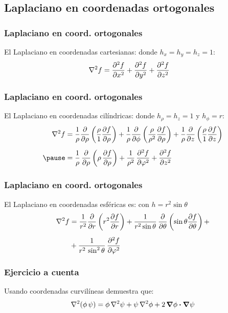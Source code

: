 \documentclass[12pt]{beamer}
\begin{document}
\subsection{Laplaciano en coordenadas ortogonales}

\begin{frame}
\frametitle{Laplaciano en coord. ortogonales}
El Laplaciano en coordenadas cartesianas:
\pause
donde $h_{x} = h_{y} = h_{z} = 1$:
\begin{align*}
\laplacian{f} &= \pdv[2]{f}{x} + \pdv[2]{f}{y} + \pdv[2]{f}{z}
\end{align*}
\end{frame}
\begin{frame}
\frametitle{Laplaciano en coord. ortogonales}
El Laplaciano en coordenadas cilíndricas:
\pause
donde $h_{\rho} = h_{z} = 1$ y $h_{\phi} = r$:
\begin{eqnarray*}
\begin{aligned}
\laplacian{f} &= \dfrac{1}{\rho} \pdv{\rho} \left( \dfrac{\rho}{1} \pdv{f}{\rho} \right) + \dfrac{1}{\rho} \pdv{\phi} \left( \dfrac{\rho}{\rho^{2}} \pdv{f}{\rho} \right) + \dfrac{1}{\rho} \pdv{z} \left( \dfrac{\rho}{1} \pdv{f}{z} \right) \\[0.5em] \pause
&= \dfrac{1}{\rho} \, \pdv{\rho} \left( \rho \, \pdv{f}{\rho} \right) + \dfrac{1}{\rho^{2}} \, \pdv[2]{f}{\varphi} + \pdv[2]{f}{z} 
\end{aligned}
\end{eqnarray*}
\end{frame}
\begin{frame}
\frametitle{Laplaciano en coord. ortogonales}
El Laplaciano en coordenadas esféricas es:
\pause
con $h = r^{2} \sin \theta$
\begin{align*}    
\laplacian{f} &= \dfrac{1}{r^{2}} \pdv{r} \left( r^{2} \pdv{f}{r} \right) + \dfrac{1}{r^{2} \sin \theta} \, \pdv{\theta} \left( \sin \theta \pdv{f}{\theta} \right) + \\[0.5em]
&+ \dfrac{1}{r^{2} \, \sin^{2} \theta} \, \pdv[2]{f}{\varphi}
\end{align*}
\end{frame}
\begin{frame}
\frametitle{Ejercicio a cuenta}
Usando coordenadas curvilíneas demuestra que:
\begin{align*}
\laplacian{(\phi \, \psi)} = \phi \, \laplacian{\psi} + \psi \, \laplacian{\phi} + 2 \, \grad{\phi} \vdot \grad{\psi}
\end{align*}
\end{frame}
\end{document}
